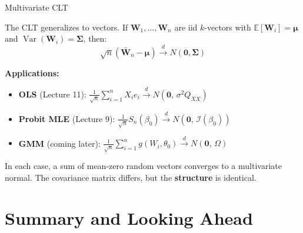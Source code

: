 \documentclass[handout, aspectratio=169]{beamer}
\numberwithin{equation}{section}
\begin{document}

\begin{frame}{Multivariate CLT}

The CLT generalizes to vectors. If $\bm{W}_1, \ldots, \bm{W}_n$ are iid $k$-vectors with $\mathbb{E}[\bm{W}_i] = \bm{\mu}$ and $\operatorname{Var}(\bm{W}_i) = \bm{\Sigma}$, then:
\[
\sqrt{n}(\bar{\bm{W}}_n - \bm{\mu}) \overset{d}{\to} N(\bm{0}, \bm{\Sigma})
\]

\pause

\textbf{Applications:}
\begin{itemize}
    \item \textbf{OLS} (Lecture 11): $\frac{1}{\sqrt{n}} \sum_{i=1}^n X_i e_i \overset{d}{\to} N(\bm{0},\, \sigma^2 Q_{XX})$

    \item \textbf{Probit MLE} (Lecture 9): $\frac{1}{\sqrt{n}} S_n(\beta_0) \overset{d}{\to} N(\bm{0},\, \mathcal{I}(\beta_0))$

    \item \textbf{GMM} (coming later): $\frac{1}{\sqrt{n}} \sum_{i=1}^n g(W_i, \theta_0) \overset{d}{\to} N(\bm{0},\, \Omega)$
\end{itemize}

\pause

In each case, a sum of mean-zero random vectors converges to a multivariate normal. The covariance matrix differs, but the \textbf{structure} is identical.

\end{frame}

\section{Summary and Looking Ahead}
\end{document}
